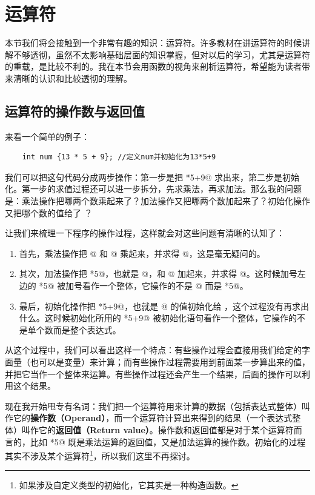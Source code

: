 \section{运算符}
本节我们将会接触到一个非常有趣的知识：运算符。许多教材在讲运算符的时候讲解不够透彻，虽然不太影响基础层面的知识掌握，但对以后的学习，尤其是运算符的重载，是比较不利的。我在本节会用函数的视角来剖析运算符，希望能为读者带来清晰的认识和比较透彻的理解。\par
\subsection*{运算符的操作数与返回值}
来看一个简单的例子：
\begin{lstlisting}
    int num {13 * 5 + 9}; //定义num并初始化为13*5+9
\end{lstlisting}
我们可以把这句代码分成两步操作：第一步是把 *5+9@ 求出来，第二步是初始化。第一步的求值过程还可以进一步拆分，先求乘法，再求加法。那么我的问题是：乘法操作把哪两个数乘起来了？加法操作又把哪两个数加起来了？初始化操作又把哪个数的值给了 \lstinline@num@？\par
让我们来梳理一下程序的操作过程，这样就会对这些问题有清晰的认知了：
\begin{enumerate}
    \item 首先，乘法操作把 @ 和 @ 乘起来，并求得 @，这是毫无疑问的。
    \item 其次，加法操作把 *5@，也就是 @，和 @ 加起来，并求得 @。这时候加号左边的 *5@ 被加号看作一个整体，它操作的不是 @ 而是 *5@。
    \item 最后，初始化操作把 *5+9@，也就是 @ 的值初始化给 \lstinline@num@，这个过程没有再求出什么。这时候初始化所用的 *5+9@ 被初始化语句看作一个整体，它操作的不是单个数而是整个表达式。
\end{enumerate}\par
从这个过程中，我们可以看出这样一个特点：有些操作过程会直接用我们给定的字面量（也可以是变量）来计算；而有些操作过程需要用到前面某一步算出来的值，并把它当作一个整体来运算。有些操作过程还会产生一个结果，后面的操作可以利用这个结果。\par
现在我开始甩专有名词：我们把一个运算符用来计算的数据（包括表达式整体）叫作它的\textbf{操作数（Operand）}，而一个运算符计算出来得到的结果（一个表达式整体）叫作它的\textbf{返回值（Return value）}。操作数和返回值都是对于某个运算符而言的，比如 *5@ 既是乘法运算的返回值，又是加法运算的操作数。初始化的过程其实不涉及某个运算符\footnote{如果涉及自定义类型的初始化，它其实是一种构造函数。}，所以我们这里不再探讨。\par
